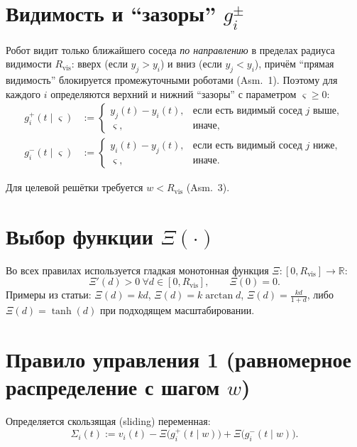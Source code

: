 \documentclass[12pt,a4paper]{article}
\begin{document}
\section{Видимость и ``зазоры'' $g_i^\pm$}

Робот видит только ближайшего соседа \emph{по направлению} в пределах радиуса видимости $R_{\mathrm{vis}}$:
вверх (если $y_j>y_i$) и вниз (если $y_j<y_i$), причём ``прямая видимость'' блокируется промежуточными роботами (Asm.~1).
Поэтому для каждого $i$ определяются верхний и нижний ``зазоры'' с параметром $\varsigma\ge 0$:
\begin{align}
g_i^+(t\mid \varsigma) &:= 
\begin{cases}
  y_j(t)-y_i(t), & \text{если есть видимый сосед $j$ выше},\\
  \varsigma, & \text{иначе},
\end{cases}
\label{eq:gplus}\\
g_i^-(t\mid \varsigma) &:=
\begin{cases}
  y_i(t)-y_j(t), & \text{если есть видимый сосед $j$ ниже},\\
  \varsigma, & \text{иначе}.
\end{cases}
\label{eq:gminus}
\end{align}

Для целевой решётки требуется $w<R_{\mathrm{vis}}$ (Asm.~3).

\section{Выбор функции $\Xi(\cdot)$}

Во всех правилах используется гладкая монотонная функция $\Xi:[0,R_{\mathrm{vis}}]\to\mathbb{R}$:
\begin{equation}
  \Xi'(d) > 0 \ \forall d\in[0,R_{\mathrm{vis}}], \qquad \Xi(0)=0.
  \label{eq:Xi}
\end{equation}
Примеры из статьи: $\Xi(d)=k d$, $\Xi(d)=k\arctan d$, $\Xi(d)=\frac{k d}{1+d}$, либо $\Xi(d)=\tanh(d)$ при подходящем масштабировании.

\section{Правило управления 1 (равномерное распределение с шагом $w$)}

Определяется скользящая (sliding) переменная:
\begin{equation}
  \Sigma_i(t) := v_i(t) - \Xi\!\bigl(g_i^+(t\mid w)\bigr) + \Xi\!\bigl(g_i^-(t\mid w)\bigr).
  \label{eq:Sigma1}
\end{equation}
\end{document}
